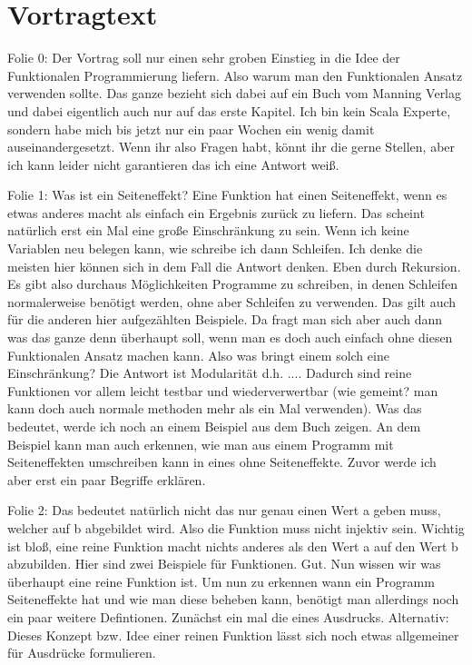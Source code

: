 \section[Section]{Vortragtext}
	\begin{frame}
	Folie 0: Der Vortrag soll nur einen sehr groben Einstieg in die Idee der Funktionalen Programmierung liefern. Also warum man den Funktionalen Ansatz verwenden sollte. Das ganze bezieht sich dabei auf ein Buch vom Manning Verlag und dabei eigentlich auch nur auf das erste Kapitel. Ich bin kein Scala Experte, sondern habe mich bis jetzt nur ein paar Wochen ein wenig damit auseinandergesetzt. Wenn ihr also Fragen habt, könnt ihr die gerne Stellen, aber ich kann leider nicht garantieren das ich eine Antwort weiß. 
	
	Folie 1: Was ist ein Seiteneffekt? Eine Funktion hat einen Seiteneffekt, wenn es etwas anderes macht als einfach ein Ergebnis zurück zu liefern. Das scheint natürlich erst ein Mal eine große Einschränkung zu sein. Wenn ich keine Variablen neu belegen kann, wie schreibe ich
	dann Schleifen. Ich denke die meisten hier können sich in dem Fall die
	Antwort denken. Eben durch Rekursion. Es gibt also durchaus 	     Möglichkeiten Programme zu schreiben, in denen Schleifen normalerweise benötigt werden, ohne aber Schleifen zu verwenden. Das gilt auch für die anderen hier aufgezählten Beispiele. Da fragt man sich aber auch dann was das ganze denn überhaupt soll, wenn man es doch auch einfach ohne diesen Funktionalen Ansatz machen kann. Also was bringt einem solch eine Einschränkung? Die Antwort ist Modularität d.h. .... Dadurch sind reine Funktionen vor allem leicht testbar und wiederverwertbar (wie gemeint? man kann doch auch normale methoden mehr als ein Mal verwenden). Was das bedeutet, werde ich noch an einem Beispiel aus dem Buch zeigen. An dem Beispiel kann man auch erkennen, wie man aus einem Programm mit Seiteneffekten umschreiben kann in eines ohne Seiteneffekte. Zuvor werde ich aber erst ein paar Begriffe erklären.
	
	Folie 2: Das bedeutet natürlich nicht das nur genau einen Wert a geben muss, welcher auf b abgebildet wird. Also die Funktion muss nicht injektiv sein. Wichtig ist bloß, eine reine Funktion macht nichts anderes als den Wert a auf den Wert b abzubilden. Hier sind zwei Beispiele für Funktionen. Gut. Nun wissen wir was überhaupt eine reine Funktion ist. Um nun zu erkennen wann ein Programm Seiteneffekte hat und wie man diese beheben kann, benötigt man allerdings noch ein paar weitere Defintionen. Zunächst ein mal die eines Ausdrucks. Alternativ:
	Dieses Konzept bzw. Idee einer reinen Funktion lässt sich noch etwas allgemeiner für Ausdrücke formulieren. 
	

\end{frame}

